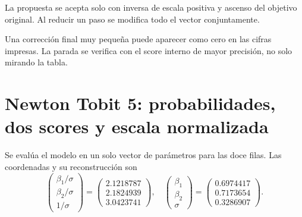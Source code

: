 \documentclass[11pt,a4paper]{article}
\begin{document}
La propuesta se acepta solo con
inversa de escala positiva
y ascenso del objetivo original.
Al reducir un paso se modifica
todo el vector conjuntamente.

Una corrección final muy pequeña
puede aparecer como cero
en las cifras impresas.
La parada se verifica con
el score interno de mayor precisión,
no solo mirando la tabla.

\clearpage
\section{Newton Tobit 5: probabilidades, dos scores y escala normalizada}\label{unidad111}
Se evalúa el modelo en un solo vector
de parámetros para las doce filas.
Las coordenadas y su reconstrucción son
\[
\begin{pmatrix}\beta_1/\sigma\\\beta_2/\sigma\\1/\sigma\end{pmatrix}=\begin{pmatrix}2.1218787\\2.1824939\\3.0423741\end{pmatrix},\quad\begin{pmatrix}\beta_1\\\beta_2\\\sigma\end{pmatrix}=\begin{pmatrix}0.6974417\\0.7173654\\0.3286907\end{pmatrix}.
\]
\end{document}
